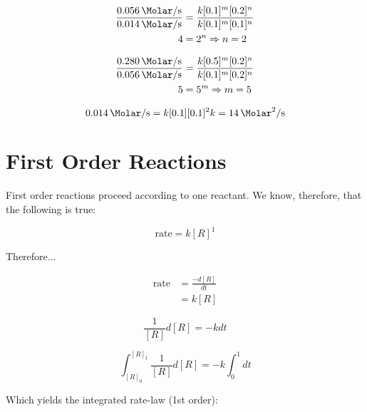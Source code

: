 \begin{equation}
  \begin{split}
    \frac{\SI{.056}{\Molar\per\second}}{\SI{.014}{\Molar\per\second}} &=
    \frac{k[0.1]^m[0.2]^n}{k[0.1]^m[0.1]^n}\\
    4 &= 2^n \Rightarrow n = 2
  \end{split}
\end{equation}

\begin{equation}
  \begin{split}
    \frac{\SI{.280}{\Molar\per\second}}{\SI{.056}{\Molar\per\second}} &=
    \frac{k[0.5]^m[0.2]^n}{k[0.1]^m[0.2]^n}\\
    5 &= 5^m \Rightarrow m = 5
  \end{split}
\end{equation}

\begin{equation}
  \SI{.014}{\Molar\per\second}=k[0.1][0.1]^2\\
  k=\SI{14}{\Molar\squared\per\second}
\end{equation}

\section{First Order Reactions}
First order reactions proceed according to one reactant. We know, therefore,
that the following is true:

\begin{equation}
  \text{rate}=k[R]^1
\end{equation}

Therefore...

\begin{equation}
  \begin{split}
    \text{rate} &= \frac{-d[R]}{dt}\\
                &= k[R]
  \end{split}
\end{equation}

\begin{equation}
  \frac{1}{[R]}d[R]=-k dt
\end{equation}

\begin{equation}
  \int_{[R]_0}^{[R]_t} \frac{1}{[R]} d[R] = -k\int_{0}^{1} dt
\end{equation}

Which yields the integrated rate-law (1st order):

